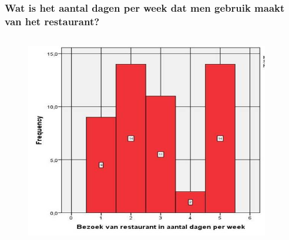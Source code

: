 \documentclass{beamer}
\begin{document}
  \begin{frame}
    \frametitle{Wat is het aantal dagen per week dat men gebruik maakt van het restaurant?}
    \begin{columns}
      \begin{column}{0.5\textwidth}

        \begin{figure}
          \centering
          \includegraphics[width=1.00\textwidth]{img/studentenbar.jpg}
          \label{fig:studentenbar}
        \end{figure}


      \end{column}
      \begin{column}{0.5\textwidth}


\end{column}
\end{columns}
\end{frame}
\end{document}
